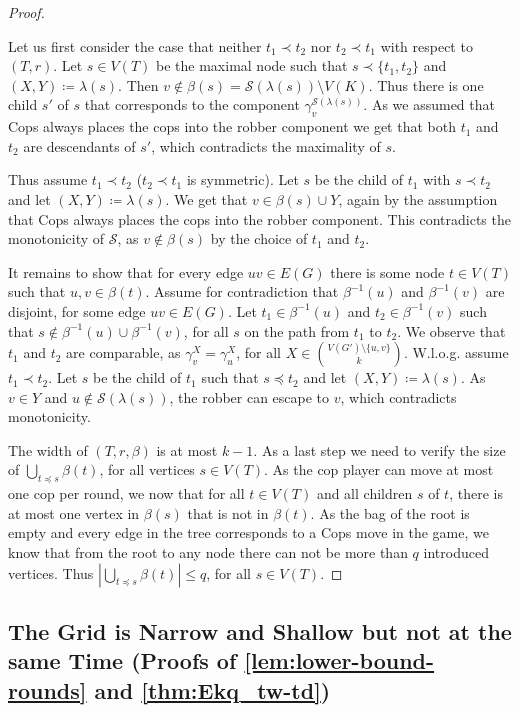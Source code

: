 \documentclass[a4paper,UKenglish,cleveref, autoref, thm-restate]{lipics-v2021}
\begin{document}
\begin{proof}
\begin{claimproof}
		Let us first consider the case that neither $t_1\prec t_2$ nor $t_2\prec t_1$ with respect to $(T,r)$.
		Let $s\in V(T)$ be the maximal node such that $s\prec \{t_1,t_2\}$ and $(X,Y)\coloneqq\lambda(s)$.
		Then $v\not\in\beta(s)=\mathcal{S}(\lambda(s))\setminus V(K)$.
		Thus there is one child $s'$ of $s$ that corresponds to the component $\gamma_v^{\mathcal{S}(\lambda(s))}$.
		As we assumed that Cops always places the cops into the robber component we get that both $t_1$ and $t_2$ are descendants of $s'$, which contradicts the maximality of $s$.
		
		Thus assume $t_1 \prec t_2$ ($t_2\prec t_1$ is symmetric).
		Let $s$ be the child of $t_1$ with $s\prec t_2$ and let $(X,Y)\coloneqq\lambda(s)$.
		We get that $v\in\beta(s)\cup Y$, again by the assumption that Cops always places the cops into the robber component.
		This contradicts the monotonicity of $\mathcal{S}$, as $v\notin \beta(s)$ by the choice of $t_1$ and $t_2$.
		
		It remains to show that for every edge $uv\in E(G)$ there is some node $t\in V(T)$ such that $u,v\in\beta(t)$.
		Assume for contradiction that $\beta^{-1}(u)$ and $\beta^{-1}(v)$ are disjoint, for some edge $uv\in E(G)$.
		Let $t_1\in \beta^{-1}(u)$ and $t_2\in \beta^{-1}(v)$ such that $s\notin\beta^{-1}(u)\cup\beta^{-1}(v)$, for all $s$ on the path from $t_1$ to $t_2$.
		We observe that $t_1$ and $t_2$ are comparable, as $\gamma_{v}^X=\gamma_u^X$, for all $X\in\binom{V(G')\setminus\{u,v\}}{k}$.
		W.l.o.g. assume $t_1\prec t_2$.
		Let $s$ be the child of $t_1$ such that $s\preceq t_2$ and let $(X,Y)\coloneqq\lambda(s)$.
		As $v\in Y$ and $u\notin\mathcal{S}(\lambda(s))$, the robber can escape to $v$, which contradicts monotonicity.
	\end{claimproof}
	
	The width of $(T,r,\beta)$ is at most $k-1$.
	As a last step we need to verify the size of $\bigcup_{t\preceq s}\beta(t)$, for all vertices $s\in V(T)$.
	As the cop player can move at most one cop per round, we now that for all $t\in V(T)$ and all children $s$ of $t$, there is at most one vertex in $\beta(s)$ that is not in $\beta(t)$.
	As the bag of the root is empty and every edge in the tree corresponds to a Cops move in the game, we know that from the root to any node there can not be more than $q$ introduced vertices.
	Thus $|\bigcup_{t\preceq s}\beta(t)|\leq q$, for all $s\in V(T)$.
\end{proof}



\subsection{The Grid is Narrow and Shallow but not at the same Time (Proofs of \cref{lem:lower-bound-rounds} and \cref{thm:Ekq_tw-td})}
\label{app:rounds}
\end{document}
